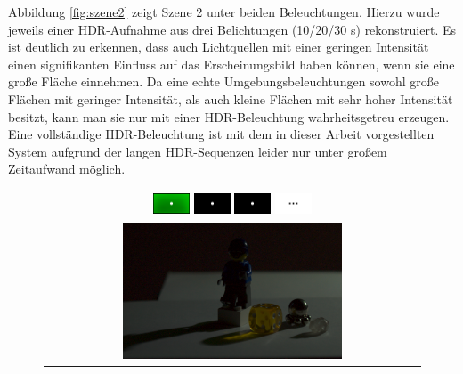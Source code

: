   Abbildung \ref{fig:szene2} zeigt Szene 2 unter beiden Beleuchtungen.
   Hierzu wurde jeweils einer HDR-Aufnahme aus drei Belichtungen (10/20/30 s) rekonstruiert.
   Es ist deutlich zu erkennen, dass auch Lichtquellen mit einer geringen Intensität einen signifikanten Einfluss auf das Erscheinungsbild haben können, wenn sie eine große Fläche einnehmen.
  Da eine echte Umgebungsbeleuchtungen sowohl große Flächen mit geringer Intensität, als auch kleine Flächen mit sehr hoher Intensität besitzt, kann man sie nur mit einer HDR-Beleuchtung wahrheitsgetreu erzeugen.
  Eine vollständige HDR-Beleuchtung ist mit dem in dieser Arbeit vorgestellten System aufgrund der langen HDR-Sequenzen leider nur unter großem Zeitaufwand möglich.   
 
    \begin{figure}[H]
    \centering
    \begin{tabular}{c}
      \includegraphics[width=0.1\textwidth]{../graphics/ergebnisse/hdr_frame_0_green.png} \hspace{5mm}
      \includegraphics[width=0.1\textwidth]{../graphics/ergebnisse/hdr_frame_1_green.png} \hspace{5mm}
      \includegraphics[width=0.1\textwidth]{../graphics/ergebnisse/hdr_frame_1_green.png} \hspace{5mm}
      \includegraphics[width=0.1\textwidth]{../graphics/ergebnisse/hdr_frame_dots.png} \hspace{4mm}
      \hfill
  \\
      \includegraphics[width=0.6\textwidth]{../graphics/ergebnisse/hdr_result_green_small.png} \\

\end{tabular}
\end{figure}
